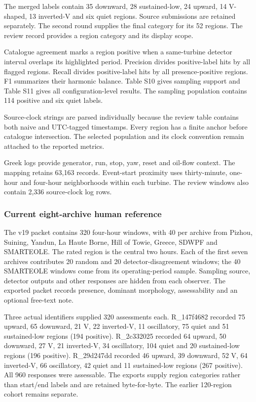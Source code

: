\documentclass[a4paper,11pt]{article}
\begin{document}
The merged labels contain 35 downward, 28 sustained-low, 24 upward, 14 V-shaped, 13 inverted-V and six quiet regions. Source submissions are retained separately. The second round supplies the final category for its 52 regions. The review record provides a region category and its display scope.

Catalogue agreement marks a region positive when a same-turbine detector interval overlaps its highlighted period. Precision divides positive-label hits by all flagged regions. Recall divides positive-label hits by all presence-positive regions. F1 summarizes their harmonic balance. Table S10 gives sampling support and Table S11 gives all configuration-level results. The sampling population contains 114 positive and six quiet labels.

Source-clock strings are parsed individually because the review table contains both naive and UTC-tagged timestamps. Every region has a finite anchor before catalogue intersection. The selected population and its clock convention remain attached to the reported metrics.

Greek logs provide generator, run, stop, yaw, reset and oil-flow context. The mapping retains 63,163 records. Event-start proximity uses thirty-minute, one-hour and four-hour neighborhoods within each turbine. The review windows also contain 2,336 source-clock log rows.

\subsubsection{Current eight-archive human reference}\label{current-eight-archive-human-reference}

The v19 packet contains 320 four-hour windows, with 40 per archive from Pizhou, Suining, Yandun, La Haute Borne, Hill of Towie, Greece, SDWPF and SMARTEOLE. The rated region is the central two hours. Each of the first seven archives contributes 20 random and 20 detector-disagreement windows; the 40 SMARTEOLE windows come from its operating-period sample. Sampling source, detector outputs and other responses are hidden from each observer. The exported packet records presence, dominant morphology, assessability and an optional free-text note.

Three actual identifiers supplied 320 assessments each. R\_147f4682 recorded 75 upward, 65 downward, 21 V, 22 inverted-V, 11 oscillatory, 75 quiet and 51 sustained-low regions (194 positive). R\_2c332025 recorded 64 upward, 50 downward, 27 V, 21 inverted-V, 34 oscillatory, 104 quiet and 20 sustained-low regions (196 positive). R\_29d247dd recorded 46 upward, 39 downward, 52 V, 64 inverted-V, 66 oscillatory, 42 quiet and 11 sustained-low regions (267 positive). All 960 responses were assessable. The exports supply region categories rather than start/end labels and are retained byte-for-byte. The earlier 120-region cohort remains separate.
\end{document}
